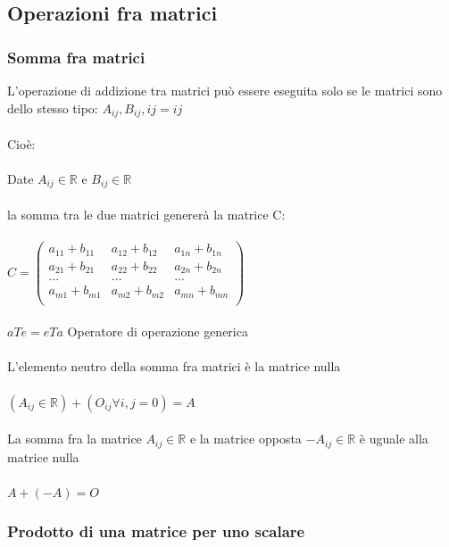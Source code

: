 \documentclass{report}
\begin{document}
\subsection{Operazioni fra matrici}

\subsubsection{Somma fra matrici}

L'operazione di addizione tra matrici può essere eseguita solo se le matrici sono dello stesso tipo: $A_{ij},B_{ij}, ij = ij$
\\
\\
Cioè:
\\
\\
Date $A_{ij} \in \mathbb{R}$ e $B_{ij} \in \mathbb{R}$ 
\\
\\
la somma tra le due matrici genererà la matrice C:
\\
\\
$
C = \begin{pmatrix}
  a_{11} + b_{11} & a_{12} + b_{12} & a_{1n} + b_{1n} \\
  a_{21} + b_{21} & a_{22} + b_{22} & a_{2n} + b_{2n} \\
  ... & ... & ... \\
  a_{m1} + b_{m1} & a_{m2} + b_{m2} & a_{mn} + b_{mn} \\

\end{pmatrix}
$
\\
\\
$aTe = eTa$ Operatore di operazione generica
\\
\\
L'elemento neutro della somma fra matrici è la matrice nulla
\\
\\
$(A_{ij} \in \mathbb{R}) + (O_{ij} \forall i,j = 0) = A$
\\
\\
La somma fra la matrice $A_{ij} \in \mathbb{R}$ e la matrice opposta $-A_{ij} \in \mathbb{R}$ è uguale alla matrice nulla
\\
\\
$
A + (-A) = O
$
\subsubsection{Prodotto di una matrice per uno scalare}
\end{document}
